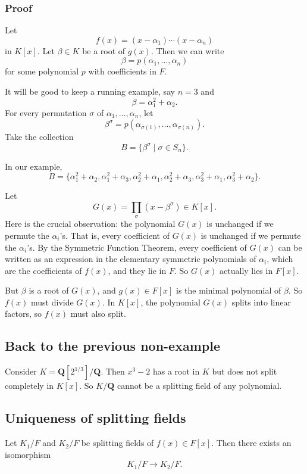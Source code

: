 \documentclass[11pt]{article}
\begin{document}
\subsubsection{Proof}
\label{sec:org3ea268a}
Let
\[ f(x) = (x-\alpha_{1}) \cdots (x-\alpha_{n})\]
in \(K[x]\).
Let \(\beta \in K\) be a root of \(g(x)\).
Then we can write
\[ \beta = p(\alpha_1, \dots, \alpha_{n})\]
for some polynomial \(p\) with coefficients in \(F\).

It will be good to keep a running example, say \(n = 3\) and
\[ \beta = \alpha_{1}^2 + \alpha_{2}.\]
For every permutation \(\sigma\) of \(\alpha_{1}, \dots, \alpha_{n}\), let
\[ \beta^{\sigma} = p(\alpha_{\sigma(1)}, \dots, \alpha_{\sigma(n)}).\]
Take the collection
\[ B = \{\beta^{\sigma} \mid \sigma \in S_{n}\}.\]

In our example,
\[ B = \{\alpha_{1}^2+\alpha_{2}, \alpha_{1}^2+\alpha_{3}, \alpha_{2}^2+\alpha_{1}, \alpha_{2}^2+\alpha_{3}, \alpha_{3}^2+\alpha_{1}, \alpha_{3}^2+\alpha_{2}\}.\]

Let
\[ G(x) = \prod_{\sigma}(x-\beta^{\sigma}) \in K[x].\]
Here is the crucial observation: the polynomial \(G(x)\) is unchanged if we permute the \(\alpha_{i}\)'s.
That is, every coefficient of \(G(x)\) is unchanged if we permute the \(\alpha_{i}\)'s.
By the Symmetric Function Theorem, every coefficient of \(G(x)\) can be written as an expression in the elementary symmetric polynomials of \(\alpha_{i}\), which are the coefficients of \(f(x)\), and they lie in \(F\).
So \(G(x)\) actually lies in \(F[x]\).

But \(\beta\) is a root of \(G(x)\), and \(g(x) \in F[x]\) is the minimal polynomial of \(\beta\).
So \(f(x)\) must divide \(G(x)\).
In \(K[x]\), the polynomial \(G(x)\) splits into linear factors, so \(f(x)\) must also split.
\subsection{Back to the previous non-example}
\label{sec:org7cf3b7a}
Consider \(K = \mathbf{Q}[2^{1/3}] / \mathbf{Q}\).
Then \(x^3-2\) has a root in \(K\) but does not split completely in \(K[x]\).
So \(K / \mathbf{Q}\) cannot be a splitting field of any polynomial.
\subsection{Uniqueness of splitting fields}
\label{sec:orgf66cea7}
Let \(K_1/F\) and \(K_2/F\) be splitting fields of \(f(x) \in F[x]\).
Then there exists an isomorphism
\[ K_1/F \to K_2/F.\]
\end{document}
